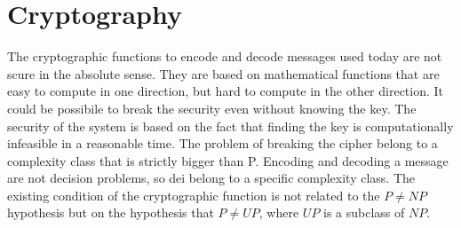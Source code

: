 \section{Cryptography}
The cryptographic functions to encode and decode messages used today are not scure in the absolute sense. They are based on mathematical functions that are easy to compute in one direction, but hard to compute in the other direction. It could be possibile to break the security even without knowing the key. The security of the system is based on the fact that finding the key is computationally infeasible in a reasonable time. The problem of breaking the cipher belong to a complexity class that is strictly bigger than P. Encoding and decoding a message are not decision problems, so dei belong to a specific complexity class. The existing condition of the cryptographic function is not related to the $P\not= NP$ hypothesis but on the hypothesis that $P\not= UP$, where $UP$ is a subclass of $NP$.